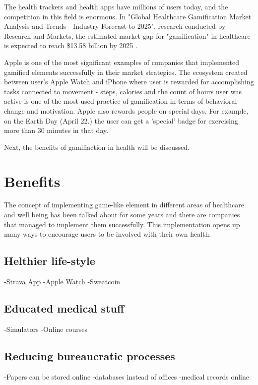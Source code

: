\documentclass[10pt,twoside,english,a4paper]{article}
\begin{document}
The health trackers and health apps have millions of users today, and the competition in this field is enormous. In "Global Healthcare Gamification Market Analysis and Trends - Industry Forecast to 2025", research conducted by Research and Markets, the estimated market gap for "gamification" in healthcare is expected to reach \$13.58 billion by 2025 \cite{mgap} .  

Apple is one of the most significant examples of companies that implemented gamified elements successfully in their market strategies. The ecosystem created between user's Apple Watch and iPhone where user is rewarded for accomplishing tasks connected to movement - steps, calories and the count of hours user was active is one of the most used practice \cite{aboveAvalon} of gamification in terms of behavioral change and motivation.  Apple also rewards people on special days. For example, on the Earth Day (April 22.) the user can get a 'special' badge for exercising more than 30 minutes in that day\cite{earthDay}. 

Next, the benefits of gamifiaction in health will be discussed.

%
%
%

\section{Benefits} \label{benefits}
The concept of implementing game-like element in different areas of healthcare and well being has been talked about for some years and there are companies that managed to implement them successfully. This implementation opens up many ways to encourage users to be involved with their own health.  

\subsection{Helthier life-style } \label{lifestyle}
-Strava App
-Apple Watch
-Sweatcoin

\subsection{Educated medical stuff} \label{stuff}
-Simulators
-Online courses

\subsection{Reducing bureaucratic processes} \label{bureau}
-Papers can be stored online
-databases instead of offices
-medical records online
\end{document}
